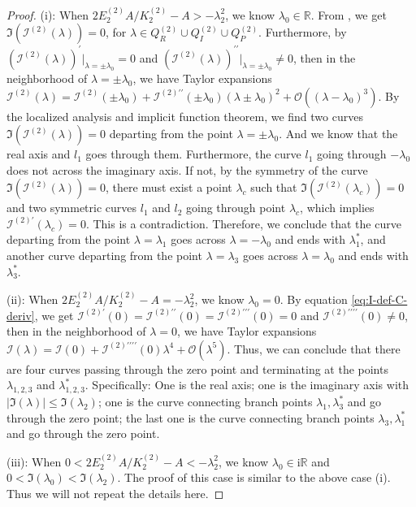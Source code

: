 \documentclass[11pt,reqno]{amsart}
\newcommand{\ii}{\mathrm{i}}
\numberwithin{equation}{section}
\begin{document}
\begin{proof}
	(i): When $2E^{(2)}_2A/K^{(2)}_2-A>-\lambda_2^2$, we know $\lambda_0\in \mathbb{R}$. From , we get ${\Im}(\mathcal{I}^{(2)}(\lambda))=0$, for $\lambda \in Q_R^{(2)} \cup Q_I^{(2)} \cup Q_P^{(2)}$.
	Furthermore, by $(\mathcal{I}^{(2)}(\lambda))^{\prime}|_{\lambda=\pm \lambda_0}=0$ and $(\mathcal{I}^{(2)}(\lambda))^{\prime \prime}|_{\lambda=\pm \lambda_0}\neq 0$, then in the neighborhood of $\lambda=\pm \lambda_0$, we have Taylor expansions $\mathcal{I}^{(2)}(\lambda)=\mathcal{I}^{(2)}(\pm \lambda_0)+\mathcal{I}^{(2)\prime\prime}(\pm \lambda_0)(\lambda\pm \lambda_0)^2+\mathcal{O}((\lambda-\lambda_0)^3)$. 
	By the localized analysis and implicit function theorem, we find two curves ${\Im}(\mathcal{I}^{(2)}(\lambda))=0$ departing from the point $\lambda=\pm \lambda_0$. 
	And we know that the real axis and $l_1$ goes through them. 
	Furthermore, the curve $l_1$ going through $-\lambda_0$ does not across the imaginary axis.
	If not, by the symmetry of the curve $\Im(\mathcal{I}^{(2)}(\lambda))=0$, there must exist a point $\lambda_c$ such that $\Im(\mathcal{I}^{(2)}(\lambda_c))=0$ and two symmetric curves $l_1$ and $l_2$ going through point $\lambda_c$, which implies $\mathcal{I}^{(2)\prime}(\lambda_c)=0$. 
	This is a contradiction.
	Therefore, we conclude that the curve departing from the point $\lambda=\lambda_1$ goes across $\lambda=-\lambda_0$ and ends with $\lambda_1^*$, and another curve departing from the point $\lambda=\lambda_3$ goes across $\lambda=\lambda_0$ and ends with $\lambda_3^*$.
	
	(ii): When $2E^{(2)}_2A/K^{(2)}_2-A=-\lambda_2^2$, we know $\lambda_0=0$. 
	By equation \eqref{eq:I-def-C-deriv}, we get
	$\mathcal{I}^{(2)\prime}(0)=\mathcal{I}^{(2)\prime\prime}(0)=\mathcal{I}^{(2)\prime\prime\prime}(0)=0$ and $\mathcal{I}^{(2)\prime\prime\prime\prime}(0)\neq 0$, then in the neighborhood of $\lambda=0$, we have Taylor expansions $\mathcal{I}(\lambda)=\mathcal{I}(0)+\mathcal{I}^{(2)\prime\prime\prime\prime}(0)\lambda^4+\mathcal{O}(\lambda^5)$. 
	Thus, we can conclude that there are four curves passing through the zero point and terminating at the points $\lambda_{1,2,3}$ and $\lambda_{1,2,3}^*$. Specifically: One is the real axis; one is the imaginary axis with $|\Im(\lambda)|\le \Im(\lambda_2)$; one is the curve connecting branch points $\lambda_1,\lambda_3^*$ and go through the zero point; the last one is the curve connecting branch points $\lambda_3,\lambda_1^*$ and go through the zero point.
		
	(iii): When $0<2E^{(2)}_2A/K^{(2)}_2-A<-\lambda_2^2$, we know $\lambda_0\in \ii \mathbb{R}$ and $0<\Im(\lambda_0)<\Im(\lambda_2)$.
	The proof of this case is similar to the above case (i).
	Thus we will not repeat the details here.
	

\end{proof}
\end{document}
